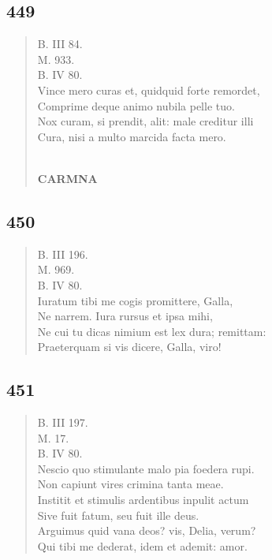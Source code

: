\documentclass[11pt, a4paper]{report}
\begin{document}
            \subsection*{449}
      \begin{verse}
      B. III 84. \\ M. 933. \\ B. IV 80. \\ Vince mero curas et, quidquid forte remordet, \\ Comprime deque animo nubila pelle tuo. \\ Nox curam, si prendit, alit: male creditur illi \\ Cura, nisi a multo marcida facta mero. \\ 
        ﻿\pagebreak 
    \begin{center} \textbf{CARMNA} \end{center} \marginpar{[336]} 
      \end{verse}
  
            \subsection*{450}
      \begin{verse}
      B. III 196. \\ M. 969. \\ B. IV 80. \\ Iuratum tibi me cogis promittere, Galla, \\ Ne narrem. Iura rursus et ipsa mihi, \\ Ne cui tu dicas nimium est lex dura; remittam: \\ Praeterquam si vis dicere, Galla, viro! \\ 
      \end{verse}
  
            \subsection*{451}
      \begin{verse}
      B. III 197. \\ M. 17. \\ B. IV 80. \\ Nescio quo stimulante malo pia foedera rupi. \\ Non capiunt vires crimina tanta meae. \\ Institit et stimulis ardentibus inpulit actum \\ Sive fuit fatum, seu fuit ille deus. \\ Arguimus quid vana deos? vis, Delia, verum? \\ Qui tibi me dederat, idem et ademit: amor. \\ 
      \end{verse}
  
\end{document}
